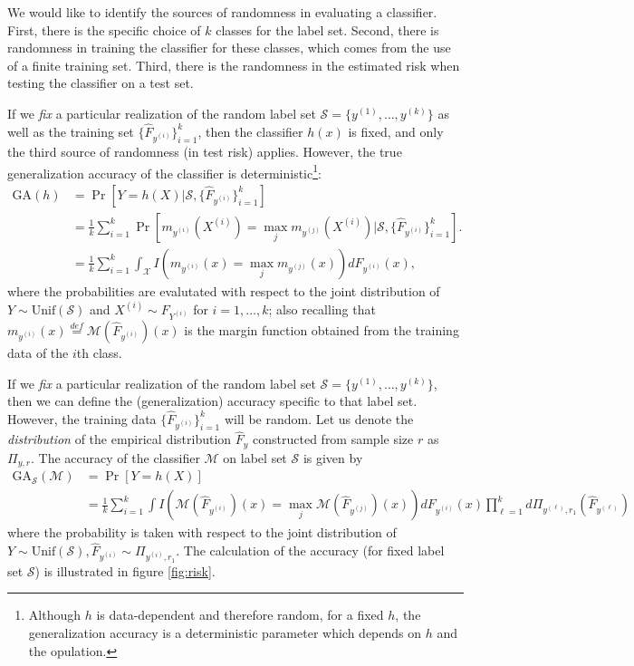 We would like to identify the sources of randomness in evaluating a
classifier.  First, there is the specific choice of $k$ classes for
the label set.   Second, there is randomness in training the classifier
for these classes, which comes from the use of a finite training
set. Third, there is the randomness in the estimated risk when
testing the classifier on a test set.

If we \emph{fix} a particular realization of the random label set
$\mathcal{S} = \{y^{(1)}, \hdots, y^{(k)}\}$ as well as the training
set $\{\hat{F}_{y^{(i)}}\}_{i=1}^k$, then the classifier $h(x)$ is
fixed, and only the third source of randomness (in test risk) applies.
However, the true generalization accuracy of the classifier is deterministic\footnote{Although $h$ is data-dependent and therefore random, for a fixed $h$, the generalization accuracy is a deterministic parameter which depends on $h$ and the opulation.}:
\begin{align*}
\text{GA}(h) &= \Pr[Y = h(X)|
  \mathcal{S}, \{\hat{F}_{y^{(i)}}\}_{i=1}^k] 
\\&= \frac{1}{k}
\sum_{i=1}^k \Pr[m_{y^{(i)}}(X^{(i)}) = \max_j m_{y^{(j)}}(X^{(i)})|\mathcal{S}, \{\hat{F}_{y^{(i)}}\}_{i=1}^k].  
\\&= \frac{1}{k}
\sum_{i=1}^k \int_{\mathcal{X}} I(m_{y^{(i)}}(x) = \max_j m_{y^{(j)}}(x)) dF_{y^{(i)}}(x),
\end{align*}
where the probabilities are evalutated with respect to the joint distribution of $Y \sim \text{Unif}(\mathcal{S})$ and $X^{(i)} \sim F_{Y^{(i)}}$ for $i = 1,\hdots, k$; also recalling that $m_{y^{(i)}}(x) \stackrel{def}{=}
\mathcal{M}(\hat{F}_{y^{(i)}})(x)$ is the margin function obtained
from the training data of the $i$th class.

If we \emph{fix} a particular realization of the random label set
$\mathcal{S} = \{y^{(1)}, \hdots, y^{(k)}\}$, then we can define the
(generalization) accuracy specific to that label set.  However, the
training data $\{\hat{F}_{y^{(i)}}\}_{i=1}^k$ will be random.  Let us
denote the \emph{distribution} of the empirical distribution
$\hat{F}_y$ constructed from sample size $r$ as $\Pi_{y, r}$.  The
accuracy of the classifier $\mathcal{M}$ on label set $\mathcal{S}$ is
given by
\begin{align*}
\text{GA}_{\mathcal{S}}(\mathcal{M}) &= \Pr[Y = h(X)] \\&= \frac{1}{k} \sum_{i=1}^k \int
I(\mathcal{M}(\hat{F}_{y^{(i)}})(x) = \max_j
\mathcal{M}(\hat{F}_{y^{(j)}})(x)) dF_{y^{(i)}}(x) \prod_{\ell=1}^k
d\Pi_{y^{(\ell)}, r_1}(\hat{F}_{y^{(\ell)}})
\end{align*}
where the probability is taken with respect to the joint distribution of $Y \sim
  \text{Unif}(\mathcal{S}), \hat{F}_{y^{(i)}} \sim \Pi_{y^{(i)}, r_1}$.
The calculation of the accuracy (for fixed label set $\mathcal{S}$) is
illustrated in figure \ref{fig:risk}.


